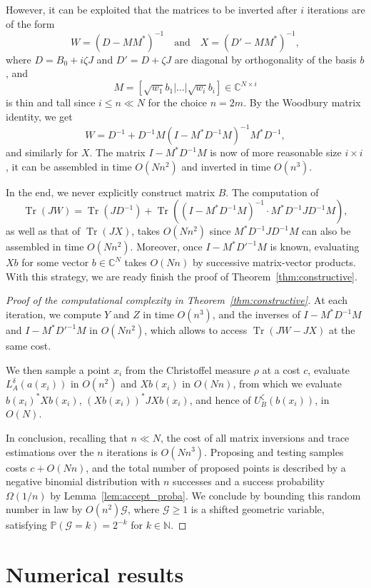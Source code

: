\documentclass[a4paper,11pt]{article}
\renewcommand{\(}{\left (}
\renewcommand{\)}{\right )}
\newcommand{\<}{\langle}
\renewcommand{\>}{\rangle}
\newcommand{\N}{\mathbb{N}}
\newcommand{\C}{\mathbb{C}}
\theoremstyle{definition}
\DeclareMathOperator{\Tr}{Tr}
\begin{document}
However, it can be exploited that the matrices to be inverted after $i$ iterations are of the form
\[
W=(D-MM^*)^{-1}\quad\text{and}\quad X=(D'-MM^*)^{-1},
\]
where $D=B_0+i\zeta J$ and $D'=D+\zeta J$ are diagonal by orthogonality of the basis $b$, and
\[
M = [\sqrt{w_1} b_1|\dots|\sqrt{w_i} b_i] \in \C^{N\times i}
\]
is thin and tall since $i\leq n\ll N$ for the choice $n=2m$. By the Woodbury matrix identity, we get
\[
W=D^{-1}+D^{-1}M(I-M^*D^{-1}M)^{-1}M^*D^{-1},
\]
and similarly for $X$. The matrix $I-M^*D^{-1}M$ is now of more reasonable size $i\times i$, it can be assembled in time $O(Nn^2)$ and inverted in time $O(n^3)$.

In the end, we never explicitly construct matrix $B$. The computation of
\[
\Tr(JW)=\Tr(J D^{-1})+\Tr((I-M^*D^{-1}M)^{-1}\cdot M^*D^{-1}JD^{-1}M),
\]
as well as that of $\Tr(JX)$, takes $O(Nn^2)$ since $M^*D^{-1}JD^{-1}M$ can also be assembled in time $O(Nn^2)$. Moreover, once $I-M^*{D'}^{-1}M$ is known, evaluating $Xb$ for some vector $b\in \C^N$ takes $O(Nn)$ by successive matrix-vector products.
With this strategy, we are ready finish the proof of Theorem~\ref{thm:constructive}.

\begin{proof}[Proof of the computational complexity in Theorem~\ref{thm:constructive}]
At each iteration, we compute $Y$ and $Z$ in time $O(n^3)$, and the inverses of $I-M^*D^{-1}M$ and $I-M^*{D'}^{-1}M$ in $O(Nn^2)$, which allows to access $\Tr(JW-JX)$ at the same cost.

We then sample a point $x_i$ from the Christoffel measure $\rho$ at a cost $c$, evaluate $L_A^\delta(a(x_i))$ in $O(n^2)$ and $Xb(x_i)$ in $O(Nn)$, from which we evaluate $b(x_i)^*Xb(x_i)$, $(Xb(x_i))^*JXb(x_i)$, and hence of $U_B^\zeta(b(x_i))$, in $O(N)$.

In conclusion, recalling that $n\ll N$, the cost of all matrix inversions and trace estimations over the $n$ iterations is $O(Nn^3)$. Proposing and testing samples costs $c+O(Nn)$, and the total number of proposed points is described by a negative binomial distribution with $n$ successes and a success probability $\Omega(1/n)$ by Lemma~\ref{lem:accept_proba}. We conclude by bounding this random number in law by $O(n^2)\mathcal G$, where $\mathcal G\geq 1$ is a shifted geometric variable, satisfying $\mathbb P(\mathcal G=k)=2^{-k}$ for $k\in\N$.
\end{proof}



\section{Numerical results}
\label{subsec:numerics}
\end{document}
